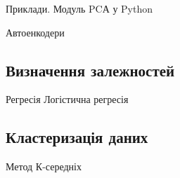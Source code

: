 % 
% 
% 
% 
% 
% 

Приклади. Модуль PCА у Python

Автоенкодери

\subsection{Визначення залежностей}

Регресія
Логістична регресія

\subsection{Кластеризація даних}

Метод К-середніх

